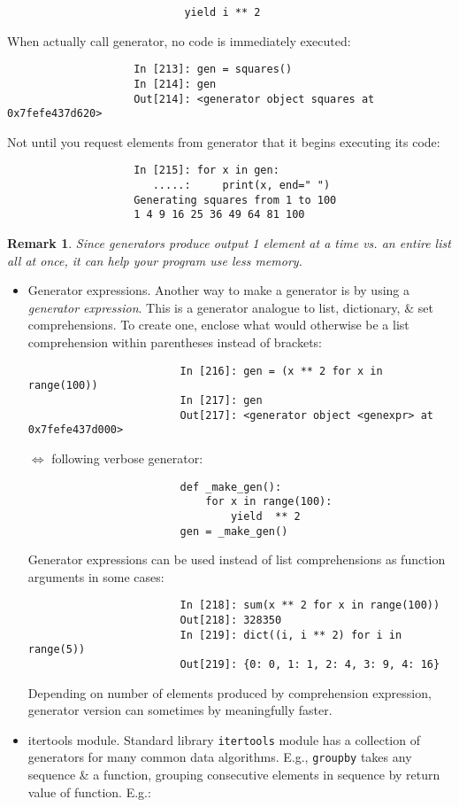 \documentclass{article}
\newtheorem{remark}{Remark}
\begin{document}
\begin{enumerate}
\begin{itemize}
\begin{itemize}
\begin{itemize}
\begin{verbatim}
					        yield i ** 2
				\end{verbatim}
				When actually call generator, no code is immediately executed:
				\begin{verbatim}
					In [213]: gen = squares()
					In [214]: gen
					Out[214]: <generator object squares at 0x7fefe437d620>
				\end{verbatim}
				Not until you request elements from generator that it begins executing its code:
				\begin{verbatim}
					In [215]: for x in gen:
					   .....:     print(x, end=" ")
					Generating squares from 1 to 100
					1 4 9 16 25 36 49 64 81 100
				\end{verbatim}
				
				\begin{remark}
					Since generators produce output 1 element at a time vs. an entire list all at once, it can help your program use less memory.
				\end{remark}
				\begin{itemize}
					\item {\sf Generator expressions.} Another way to make a generator is by using a {\it generator expression}. This is a generator analogue to list, dictionary, \& set comprehensions. To create one, enclose what would otherwise be a list comprehension within parentheses instead of brackets:
					\begin{verbatim}
						In [216]: gen = (x ** 2 for x in range(100))
						In [217]: gen
						Out[217]: <generator object <genexpr> at 0x7fefe437d000>
					\end{verbatim}
					$\Leftrightarrow$ following verbose generator:
					\begin{verbatim}
						def _make_gen():
						    for x in range(100):
						        yield  ** 2
						gen = _make_gen()
					\end{verbatim}
					Generator expressions can be used instead of list comprehensions as function arguments in some cases:
					\begin{verbatim}
						In [218]: sum(x ** 2 for x in range(100))
						Out[218]: 328350
						In [219]: dict((i, i ** 2) for i in range(5))
						Out[219]: {0: 0, 1: 1, 2: 4, 3: 9, 4: 16}
					\end{verbatim}
					Depending on number of elements produced by comprehension expression, generator version can sometimes by meaningfully faster.
					\item {\sf itertools module.} Standard library {\tt itertools} module has a collection of generators for many common data algorithms. E.g., {\tt groupby} takes any sequence \& a function, grouping consecutive elements in sequence by return value of function. E.g.:

\end{itemize}
\end{itemize}
\end{itemize}
\end{itemize}
\end{enumerate}
\end{document}
